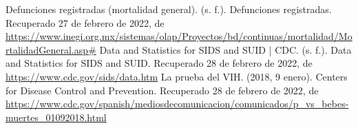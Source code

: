 \begin{thebibliography}{00}
     Defunciones registradas (mortalidad general). (s. f.). Defunciones registradas. Recuperado 27 de febrero de 2022, de \url{https://www.inegi.org.mx/sistemas/olap/Proyectos/bd/continuas/mortalidad/MortalidadGeneral.asp#}
     Data and Statistics for SIDS and SUID | CDC. (s. f.). Data and Statistics for SIDS and SUID. Recuperado 28 de febrero de 2022, de \url{https://www.cdc.gov/sids/data.htm}
     La prueba del VIH. (2018, 9 enero). Centers for Disease Control and Prevention. Recuperado 28 de febrero de 2022, de \url{https://www.cdc.gov/spanish/mediosdecomunicacion/comunicados/p_vs_bebes-muertes_01092018.html}
\end{thebibliography}

\printglossary[type=\acronymtype]
